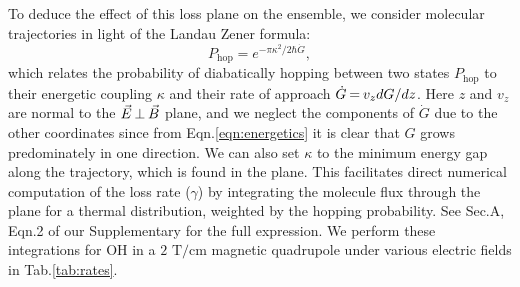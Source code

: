 \documentclass[%
 reprint,
 amsmath,amssymb,
 aps,
prl,
]{revtex4-1}
\newcommand{\epb}{{$\vec{E}\s {\perp}\s\vec{B}$}}
\newcommand{\s}{{\nobreak\hspace{.2em}}}
\begin{document}
To deduce the effect of this loss plane on the ensemble, we consider molecular trajectories in light of the Landau Zener formula:
\begin{equation}
\label{eqn:lz}
P_\text{hop}=e^{-\pi\kappa^2/2\hbar\dot{G}},
\end{equation}
which relates the probability of diabatically hopping between two states $P_\text{hop}$ to their energetic coupling $\kappa$ and their rate of approach $\dot{G}\s {=}\s v_zdG/dz$.
Here $z$ and $v_z$ are normal to the \epb{} plane, and we neglect the components of $\dot{G}$ due to the other coordinates since from Eqn.\s\ref{eqn:energetics} it is clear that $G$ grows predominately in one direction.
We can also set $\kappa$ to the minimum energy gap along the trajectory, which is found in the plane.
This facilitates direct numerical computation of the loss rate ($\gamma$) by integrating the molecule flux through the plane for a thermal distribution, weighted by the hopping probability. See Sec.\s A, Eqn.\s2 of our Supplementary\s\cite{ssm} for the full expression.  
We perform these integrations for OH in a $2\text{ T/cm}$ magnetic quadrupole\s\cite{Sawyer2008} under various electric fields in Tab.\s\ref{tab:rates}.
\end{document}

